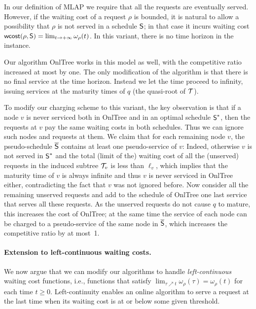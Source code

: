 \documentclass[a4paper]{article}
\newcommand{\calT}{{\cal T}}
\newcommand{\wcost}{\mbox{\rm\textsf{wcost}}}
\newcommand{\length}{\ell}
\newcommand{\OnAlgTreesGeneral}{{\sc OnlTree}}
\newcommand{\MLAP}{\mbox{\rm\textsf{MLAP}}}
\newcommand{\schedS}{\mbox{\rm\textsf{S}}}
\newcommand{\optschedS}{\mbox{\rm\textsf{S}}^\ast}
\newcommand{\pseudoschedS}{\overline{\mbox{\rm\textsf{S}}}}
\begin{document}
In our definition of {\MLAP} we require that all the requests are
eventually served. However, if the waiting cost of a request $\rho$ is
bounded, it is natural to allow a possibility that $\rho$ is not
served in  a schedule $\schedS$; in that case it incurs waiting cost 
$\wcost(\rho,\schedS)=\lim_{t\rightarrow+\infty}\omega_\rho(t)$. In
this variant, there is no time horizon in the instance.

Our algorithm {\OnAlgTreesGeneral} works in this model as well, with
the competitive ratio increased at most by one. The only modification of
the algorithm is that there is no final service at the time
horizon.  Instead we let the time proceed to infinity, issuing
services at the maturity times of $q$ (the quasi-root of $\calT$). 

To modify our charging scheme to this variant, the key observation is
that if a node $v$ is never serviced both in {\OnAlgTreesGeneral}
and in an optimal schedule $\optschedS$, then the requests at $v$ pay
the same waiting costs in both schedules. Thus we can ignore such
nodes and requests at them. We claim that for each remaining node
$v$, the pseudo-schedule $\pseudoschedS$ contains at least one
pseudo-service of $v$: Indeed, otherwise $v$ is not served in
$\optschedS$ and the total (limit of the) waiting cost of all the
(unserved) requests in the induced subtree $\calT_v$ is less than $\length_v$,
which implies that the maturity time of $v$ is always infinite and
thus $v$ is never serviced in {\OnAlgTreesGeneral} either,
contradicting the fact that $v$ was not ignored before. Now consider
all the remaining unserved requests and add to the schedule of
{\OnAlgTreesGeneral} one last service that serves all these requests.
As the unserved requests do not cause $q$ to mature, this increases
the cost of {\OnAlgTreesGeneral}; at the same time the service of
each node can be charged to a pseudo-service of the same node
in $\pseudoschedS$, which increases the competitive ratio by at most~1.


\paragraph{Extension to left-continuous waiting costs.}  

We now argue that we can modify our algorithms to handle
\emph{left-continuous} waiting cost functions, i.e., functions that
satisfy $\lim_{\tau \nearrow t} \omega_\rho(\tau) = \omega_\rho(t)$
for each time $t\ge 0$.  Left-continuity enables an online algorithm
to serve a request at the last time when its waiting cost is at or
below some given threshold.
\end{document}
